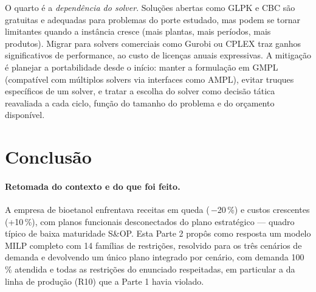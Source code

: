 \documentclass[11pt,a4paper]{article}
\begin{document}
O quarto é a \emph{dependência do solver}. Soluções abertas como GLPK e CBC são gratuitas e adequadas para problemas do porte estudado, mas podem se tornar limitantes quando a instância cresce (mais plantas, mais períodos, mais produtos). Migrar para solvers comerciais como Gurobi ou CPLEX traz ganhos significativos de performance, ao custo de licenças anuais expressivas. A mitigação é planejar a portabilidade desde o início: manter a formulação em GMPL (compatível com múltiplos solvers via interfaces como AMPL), evitar truques específicos de um solver, e tratar a escolha do solver como decisão tática reavaliada a cada ciclo, função do tamanho do problema e do orçamento disponível.

\section{Conclusão}

\paragraph{Retomada do contexto e do que foi feito.}
A empresa de bioetanol enfrentava receitas em queda (\,$-$20\,\%) e custos crescentes (+10\,\%), com planos funcionais desconectados do plano estratégico --- quadro típico de baixa maturidade S\&OP. Esta Parte 2 propôs como resposta um modelo MILP completo com 14 famílias de restrições, resolvido para os três cenários de demanda e devolvendo um único plano integrado por cenário, com demanda 100\,\% atendida e todas as restrições do enunciado respeitadas, em particular a da linha de produção (R10) que a Parte 1 havia violado.
\end{document}
